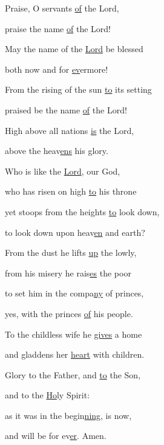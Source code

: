 \noindent Praise, O servants \uline{of} the Lord,~\GreStar{}~\nopagebreak

praise the name \uline{of} the Lord!

\noindent May the name of the \uline{Lord} be blessed~\GreStar{}~\nopagebreak

both now and for \uline{ev}ermore!

\noindent From the rising of the sun \uline{to} its setting~\GreStar{}~\nopagebreak

praised be the name \uline{of} the Lord!

\noindent High above all nations \uline{is} the Lord,~\GreStar{}~\nopagebreak

above the heav\uline{ens} his glory.

\noindent Who is like the \uline{Lord}, our God,~\GreStar{}~\nopagebreak

who has risen on high \uline{to} his throne

\noindent yet stoops from the heights \uline{to} look down,~\GreStar{}~\nopagebreak

to look down upon heav\uline{en} and earth?

\noindent From the dust he lifts \uline{up} the lowly,~\GreStar{}~\nopagebreak

from his misery he rais\uline{es} the poor

\noindent to set him in the compa\uline{ny} of princes,~\GreStar{}~\nopagebreak

yes, with the princes \uline{of} his people.

\noindent To the childless wife he \uline{gives} a home~\GreStar{}~\nopagebreak

and gladdens her \uline{heart} with children.

\noindent Glory to the Father, and \uline{to} the Son,~\GreStar{}~\nopagebreak

and to the \uline{Ho}ly Spirit:

\noindent as it was in the begin\uline{ning}, is now,~\GreStar{}~\nopagebreak

and will be for ev\uline{er}. Amen.
